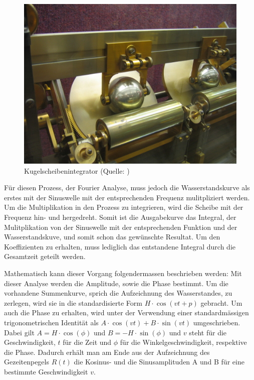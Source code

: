 \begin{figure}
	\centering
	\includegraphics[width=\textwidth]{papers/gezeiten/Harmonic_analyser_disc_and_sphere.jpg}
	\caption{Kugelscheibenintegrator (Quelle:
		\cite{gezeiten:KugelScheibenIntegrator})
	\label{fig:harmonicanalyserdiscandsphere}}
\end{figure}

Für diesen Prozess, der Fourier Analyse, muss jedoch die  Wasserstandskurve als erstes mit der Sinuswelle mit der entsprechenden Frequenz mulitpliziert werden.
Um die Multiplikation in den Prozess zu integrieren, wird die Scheibe mit der Frequenz hin- und hergedreht.
Somit ist die Ausgabekurve das Integral, der Mulitplikation von der Sinuswelle mit der entsprechenden Funktion und der Wasserstandskuve, und somit schon das gewünschte Resultat.
Um den Koeffizienten zu erhalten, muss lediglich das entstandene Integral durch die Gesamtzeit geteilt werden.

Mathematisch kann dieser Vorgang folgendermassen beschrieben werden:
Mit dieser Analyse werden die Amplitude, sowie die Phase bestimmt.
Um die vorhandene Summenkurve, sprich die Aufzeichnung des Wasserstandes, zu zerlegen, wird sie in die standardisierte Form $H\cdot\cos(vt+p)$ gebracht.
Um auch die Phase zu erhalten, wird unter der Verwendung einer standardmässigen trigonometrischen Identität als $A\cdot\cos(vt)+B\cdot\sin(vt)$ umgeschrieben.
Dabei gilt $A=H\cdot\cos(\phi)$ und $B=-H\cdot\sin(\phi)$ und $v$ steht für die Geschwindigkeit, $t$ für die Zeit und $\phi$ für die Winkelgeschwindigkeit, respektive die Phase.
Dadurch erhält man am Ende aus der Aufzeichnung des Gezeitenpegels $R(t)$ die Kosinus- und die Sinusamplituden A und B für eine bestimmte Geschwindigkeit $v$.


